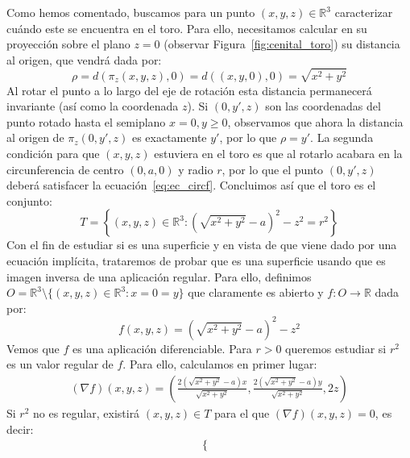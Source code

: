 \begin{ejemplo}
\begin{enumerate}
            \noindent
            Como hemos comentado, buscamos para un punto $(x,y,z)\in \mathbb{R}^3$ caracterizar cuándo este se encuentra en el toro. Para ello, necesitamos calcular en su proyección sobre el plano $z=0$ (observar Figura~\ref{fig:cenital_toro}) su distancia al origen, que vendrá dada por:
            \begin{equation*}
                \rho = d(\pi_z(x,y,z), 0) = d((x,y,0),0) = \sqrt{x^2+y^2}
            \end{equation*}
            Al rotar el punto a lo largo del eje de rotación esta distancia permanecerá invariante (así como la coordenada $z$). Si $(0,y',z)$ son las coordenadas del punto rotado hasta el semiplano $x=0,y\geq 0$, observamos que ahora la distancia al origen de $\pi_z(0,y',z)$ es exactamente $y'$, por lo que $\rho = y'$. La segunda condición para que $(x,y,z)$ estuviera en el toro es que al rotarlo acabara en la circunferencia de centro $(0,a,0)$ y radio $r$, por lo que el punto $(0,y',z)$ deberá satisfacer la ecuación~\eqref{eq:ec_circf}. Concluimos así que el toro es el conjunto:
            \begin{equation*}
                T = \left\{(x,y,z)\in \mathbb{R}^3 : {\left(\sqrt{x^2+y^2}-a\right)}^{2}-z^2 = r^2\right\}
            \end{equation*}
            Con el fin de estudiar si es una superficie y en vista de que viene dado por una ecuación implícita, trataremos de probar que es una superficie usando que es imagen inversa de una aplicación regular. Para ello, definimos $O = \mathbb{R}^3 \setminus \{(x,y,z)\in \mathbb{R}^3 : x=0=y\}$ que claramente es abierto y $f:O\to\mathbb{R}$ dada por:
            \begin{equation*}
                f(x,y,z) = {\left(\sqrt{x^2+y^2}-a\right)}^{2}-z^2
            \end{equation*}
            Vemos que $f$ es una aplicación diferenciable. Para $r>0$ queremos estudiar si $r^2$ es un valor regular de $f$. Para ello, calculamos en primer lugar:
            \begin{gather*}
                (\nabla f)(x,y,z) = \left(\frac{2\left(\sqrt{x^2 + y^2} -a\right)x}{\sqrt{x^2 + y^2}}, \frac{2\left(\sqrt{x^2 + y^2} -a\right)y}{\sqrt{x^2 + y^2}}, 2z \right) 
            \end{gather*}
            Si $r^2$ no es regular, existirá $(x,y,z)\in T$ para el que $(\nabla f)(x,y,z) = 0$, es decir:
            \begin{gather*}
                \left\{
                \begin{array}{l}

\end{array}
\end{gather*}
\end{enumerate}
\end{ejemplo}
